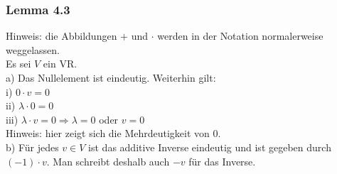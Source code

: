 \documentclass{article}
\begin{document}
\subsubsection*{Lemma 4.3}
Hinweis: die Abbildungen $+$ und $\cdot$ werden in der Notation normalerweise weggelassen. \\
Es sei $V$ ein VR. \\
a) 
Das Nullelement ist eindeutig. Weiterhin gilt: \\
i) $0 \cdot v = 0$ \\
ii) $\lambda \cdot 0 = 0$ \\
iii) $\lambda \cdot v = 0 \Rightarrow \lambda = 0$ oder $v = 0$ \\
Hinweis: hier zeigt sich die Mehrdeutigkeit von 0. \\
b) 
Für jedes $v \in V$ ist das additive Inverse eindeutig und ist gegeben durch $(-1) \cdot v$. Man schreibt deshalb auch $-v$ für das Inverse. \\
\\
\end{document}
